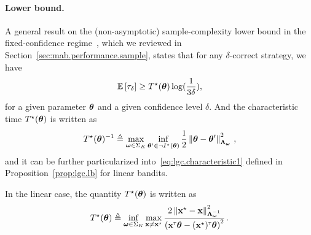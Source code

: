 \paragraph{Lower bound.} 
A general result on the (non-asymptotic) sample-complexity lower bound in the fixed-confidence regime~\citep{garivier2016tracknstop}, which we reviewed in Section~\ref{sec:mab.performance.sample}, states that for any $\delta$-correct strategy, we have
\begin{align}\label{eq:lgc.lb}
    \mathbb{E}\left[\tau_\delta\right] \geq T^\star({\boldsymbol \theta})\log(\frac{1}{3\delta}),
\end{align}
for a given parameter ${\boldsymbol \theta}$ and a given confidence level $\delta$. And the characteristic time $T^\star({\boldsymbol \theta})$ is written as
\begin{align}\label{eq:lgc.characteristic2}
    T^{\star}({\boldsymbol \theta})^{-1} \triangleq \max_{{\boldsymbol \omega} \in \Sigma_K} \inf_{{\boldsymbol \theta}'\in \neg I^\star({\boldsymbol \theta})} \frac{1}{2}\left\lVert{\boldsymbol \theta} - {\boldsymbol \theta}'\right\rVert_{{\boldsymbol \Lambda}_{{\boldsymbol \omega}}}^2\,,
\end{align}
and it can be further particularized into~\eqref{eq:lgc.characteristic1} defined in Proposition~\ref{prop:lgc.lb} for linear bandits.

\begin{proposition}\label{prop:lgc.lb}
\begin{leftbar}[propositionbar]
In the linear case, the quantity $T^\star({\boldsymbol \theta})$ is written as
\begin{align}\label{eq:lgc.characteristic1}
    T^\star({\boldsymbol \theta}) \triangleq \inf_{{\boldsymbol \omega}\in\Sigma_K}\max_{{\bf x}\neq {\bf x}^\star} \frac{2\left\lVert{\bf x}^\star - {\bf x}\right\rVert^2_{{\boldsymbol \Lambda}_{{\boldsymbol \omega}}^{-1}}}{\left({\bf x}^\mathsf{\scriptscriptstyle T}{\boldsymbol \theta}-({\bf x}^\star)^\mathsf{\scriptscriptstyle T}{\boldsymbol \theta}\right)^2}\,.
\end{align}
\end{leftbar}
\end{proposition}



